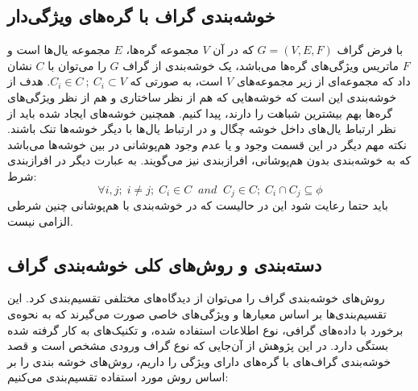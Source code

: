 \subsection{خوشه‌بندی گراف با گره‌های ویژگی‌دار }
با فرض گراف $G=(V,E,F)$ که در آن $V$ مجموعه گره‌ها، $E$ مجموعه یال‌ها است و $F$ ماتریس ویژگی‌های گره‌ها می‌باشد، یک خوشه‌بندی از گراف $G$ را می‌توان با $C$ نشان داد که مجموعه‌ای از زیر مجموعه‌های $V$ است، به صورتی که  $C_i\in C\:;\:C_i\subset V$. هدف از خوشه‌بندی این است که خوشه‌هایی که هم از نظر ساختاری و هم از نظر ویژگی‌های گره‌ها بهم بیشترین شباهت را دارند، پیدا کنیم. همچنین خوشه‌های ایجاد شده باید از نظر ارتباط‌ یال‌های داخل خوشه چگال و در ارتباط یال‌ها با دیگر خوشه‌ها تنک باشند. نکته مهم دیگر در این قسمت وجود و یا عدم وجود هم‌پوشانی در بین خوشه‌ها می‌باشد که به خوشه‌بندی بدون هم‌پوشانی، افرازبندی نیز می‌گویند. به عبارت دیگر در افرازبندی شرط:
$$ 
\forall i,j;\; i\ne j;\; C_i \in C \;\; and \;\; C_j \in C;\; C_i \cap C_j \subseteq \phi
$$
باید حتما رعایت شود این در حالیست که در خوشه‌بندی با هم‌پوشانی چنین شرطی الزامی نیست.
\subsection{دسته‌بندی و روش‌های کلی خوشه‌بندی گراف}
 روش‌های خوشه‌بندی گراف را می‌توان از دیدگاه‌های مختلفی تقسیم‌بندی کرد. این تقسیم‌بندی‌ها بر اساس معیارها و ویژگی‌های خاصی صورت می‌گیرند که به نحوه‌ی برخورد با داده‌های گرافی، نوع اطلاعات استفاده شده، و تکنیک‌های به کار گرفته شده بستگی دارد. در این پژوهش از آن‌جایی که نوع گراف ورودی مشخص است و قصد خوشه‌بندی گراف‌های  با گره‌های دارای ویژگی را داریم، روش‌های خوشه‌ بندی را بر اساس روش‌ مورد استفاده تقسیم‌بندی می‌کنیم:

